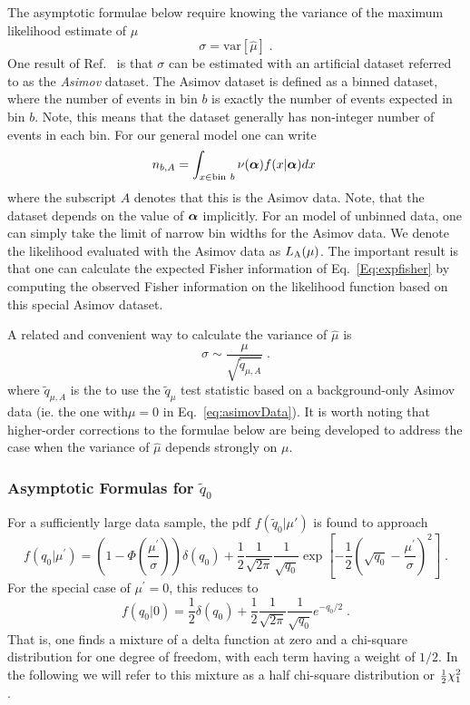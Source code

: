 \documentclass{cernrep}
\def\half{\mbox{\small $\frac{1}{2}$}}
\def\vec#1{\ifmmode
\mathchoice{\mbox{\boldmath$\displaystyle\bf#1$}}
{\mbox{\boldmath$\textstyle\bf#1$}}
{\mbox{\boldmath$\scriptstyle\bf#1$}}
{\mbox{\boldmath$\scriptscriptstyle\bf#1$}}\else
{\mbox{\boldmath$\bf#1$}}\fi}
\def\half{\mbox{\small $\frac{1}{2}$}}
\begin{document}
 The asymptotic formulae below require knowing the variance of the maximum likelihood estimate of $\mu$
 \begin{equation}
 \sigma=\textrm{var}[\hat\mu]\;.
 \end{equation}
 One result of Ref.~\cite{asimov} is that $\sigma$ can be
estimated with an artificial dataset referred to as the \textit{ Asimov} dataset.  The Asimov dataset is defined as a binned dataset, where the number of events in bin $b$ is exactly the number of events expected in bin $b$.  Note, this means that the dataset generally has non-integer number of events in each bin.  For our general model one can write
\begin{equation}
\label{eq:asimovData}
n_{b,A} = \int_{x \in \textrm{bin}~b} \nu(\vec\alpha) f(x|\vec\alpha) dx \;
\end{equation}
where the subscript $A$ denotes that this is the Asimov data.  Note, that the dataset depends on the value of $\vec\alpha$ implicitly.  For an model of unbinned data, one can simply take the limit of narrow bin widths for the Asimov data.    We denote the likelihood evaluated with the Asimov data as $L_{\rm A}(\mu)$. 
The important result is that one can calculate the expected Fisher information of Eq.~\ref{Eq:expfisher} by computing the observed Fisher information on the likelihood function based on this special Asimov dataset.  

A related and convenient way to calculate the variance of $\hat\mu$ is 
\begin{equation}
\label{eq:sigmaofmu}
\sigma \sim \frac{\mu}{\sqrt {\tilde q_{\mu,A}}} \;.
\end{equation}
where $\tilde q_{\mu,A}$ is the to use the $\tilde q_\mu$ test statistic based on a background-only Asimov data (ie. the one with$\mu=0$ in Eq.~\ref{eq:asimovData}).  It is worth noting that higher-order corrections to the formulae below are being developed to address the case when the variance of $\hat\mu$ depends strongly on $\mu$.


 \subsubsection{Asymptotic Formulas for $\tilde q_{0}$}
For a sufficiently large data sample,  the pdf $f(\tilde{q}_{0} | \mu')$ is found to approach
\begin{equation}
\label{eq:fq0muprimewald}
f(q_0 | \mu^{\prime}) = \left( 1 - 
\Phi \left( \frac{ \mu^{\prime}}{\sigma} \right) \right) \delta(q_0)  + 
\frac{1}{2}
\frac{1}{\sqrt{2 \pi}} \frac{1}{\sqrt{q_0}} \exp 
\left[ - \frac{1}{2} \left( \sqrt{q_0} - \frac{\mu^{\prime}}{\sigma} 
\right)^2 \right] 
\;.
\end{equation}
For the special case of $\mu^{\prime} = 0$, this reduces to
\begin{equation}
\label{eq:fq00}
f(q_0 | 0) = \frac{1}{2} \delta(q_0) + 
\frac{1}{2} \frac{1}{\sqrt{2 \pi}} \frac{1}{\sqrt{q_0}} e^{-q_0/2} \;.
\end{equation}
That is, one finds a mixture of a delta function at zero and
a chi-square distribution for one degree of freedom, with each term
having a weight of $1/2$.  In the following we will refer to this
mixture as a half chi-square distribution or $\half \chi^2_1$.
\end{document}
